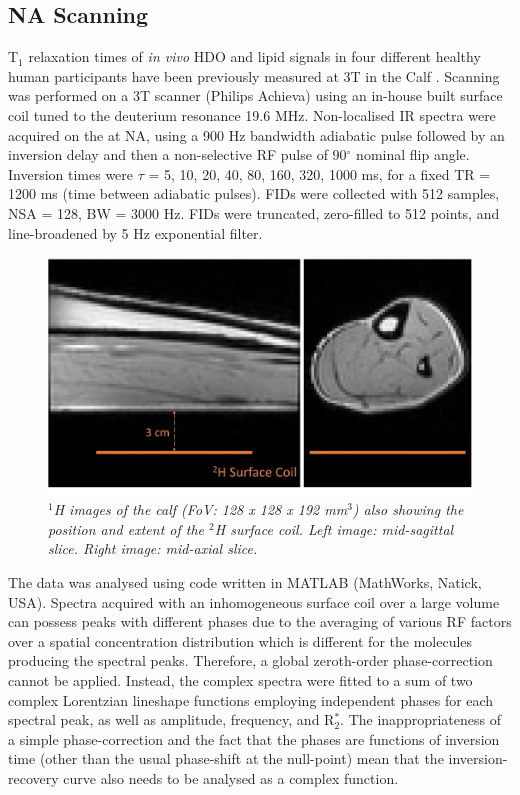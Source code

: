 \subsection{\ac{NA} Scanning}

T$_1$ relaxation times of \textit{in vivo} \ac{HDO} and lipid signals in four different healthy human participants have been previously measured at 3T in the Calf \cite{Damion2021NaturalT}. Scanning was performed on a 3T scanner (Philips Achieva) using an in-house built surface coil tuned to the deuterium resonance 19.6 MHz. Non-localised \ac{IR} spectra were acquired on the at \ac{NA}, using a 900 Hz bandwidth adiabatic pulse followed by an inversion delay and then a non-selective \ac{RF} pulse of 90$^\circ$ nominal flip angle. Inversion times were $\tau$ = {5, 10, 20, 40, 80, 160, 320, 1000} ms, for a fixed \ac{TR} = 1200 ms (time between adiabatic pulses). \ac{FID}s were collected with 512 samples, NSA = 128, \ac{BW} = 3000 Hz. FIDs were truncated, zero-filled to 512 points, and line-broadened by 5 Hz exponential filter. %

\begin{figure}
    \centering
    \includegraphics[width=1\textwidth]{Figures/Lipid/Coil.jpg}
    \caption{\textit{$^1$H images of the calf (FoV: 128 x 128 x 192 mm$^3$) also showing the position and extent of the $^2$H surface coil. Left image: mid-sagittal slice. Right image: mid-axial slice.}}
    \label{fig:Lip:Coil}
\end{figure}

The data was analysed using code written in MATLAB (MathWorks, Natick, USA). Spectra acquired with an inhomogeneous surface coil over a large volume can possess peaks with different phases due to the averaging of various \ac{RF} factors over a spatial concentration distribution which is different for the molecules producing the spectral peaks. Therefore, a global zeroth-order phase-correction cannot be applied. Instead, the complex spectra were fitted to a sum of two complex Lorentzian lineshape functions employing independent phases for each spectral peak, as well as amplitude, frequency, and R$_2^*$. The inappropriateness of a simple phase-correction and the fact that the phases are functions of inversion time (other than the usual phase-shift at the null-point) mean that the inversion-recovery curve also needs to be analysed as a complex function.

